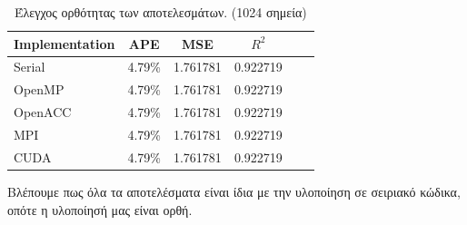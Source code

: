 \documentclass[11pt]{scrartcl} %
\begin{document}
\begin{table}[H]
    \centering
    \begin{tabular}{|l|c|c|c|c|c|}
    \hline
        Implementation & APE   & MSE   & $R^2$ \\ \hline
        Serial         & 4.79\% & 1.761781 & 0.922719 \\
        OpenMP         & 4.79\% & 1.761781 & 0.922719 \\
        OpenACC        & 4.79\% & 1.761781 & 0.922719 \\
        MPI            & 4.79\% & 1.761781 & 0.922719 \\
        CUDA           & 4.79\% & 1.761781 & 0.922719 \\
    \hline
    \end{tabular}
    \caption{Έλεγχος ορθότητας των αποτελεσμάτων. (1024 σημεία)}
\end{table}

Βλέπουμε πως όλα τα αποτελέσματα είναι ίδια με την υλοποίηση σε σειριακό κώδικα, οπότε η υλοποίησή μας είναι ορθή.


\end{document}
